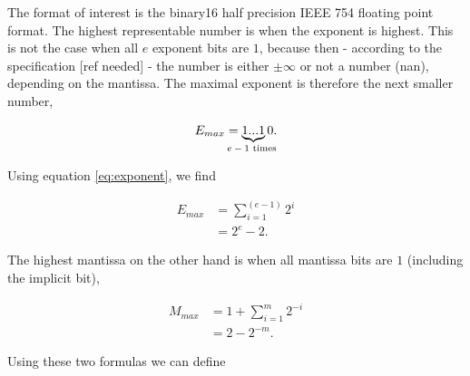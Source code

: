 \documentclass{article}
\theoremstyle{definition}
\numberwithin{equation}{section}
\begin{document}

The format of interest is the \gls{binary16} half precision IEEE 754 floating point format. The highest representable number is when the exponent is highest. This is not the case when all $e$ exponent bits are $1$, because then - according to the specification [ref needed] - the number is either $\pm \infty$ or not a number (\acrshort{nan}), depending on the mantissa. The maximal exponent is therefore the next smaller number,

\begin{align*}
    E_{max} = \underbrace{ 1...1 }_{\text{\makebox[0pt]{$e-1$ times} }}0.
\end{align*}

Using equation \ref{eq:exponent}, we find

\begin{align*}
    E_{max} &= \sum_{i=1}^{(e-1)} 2^i \\
            &= 2^e -2.
\end{align*}

The highest mantissa on the other hand is when all mantissa bits are $1$ (including the implicit bit),

\begin{align*}
    M_{max} &= 1 + \sum_{i=1}^{m} 2^{-i} \\
            &= 2 - 2^{-m}.
\end{align*}

Using these two formulas we can define
\end{document}
